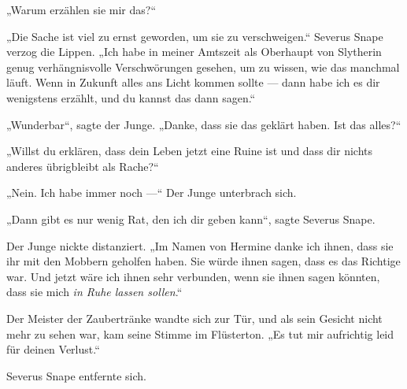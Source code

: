 „Warum erzählen sie mir das?“

„Die Sache ist viel zu ernst geworden, um sie zu verschweigen.“ Severus Snape verzog die Lippen.
„Ich habe in meiner Amtszeit als Oberhaupt von Slytherin genug verhängnisvolle Verschwörungen gesehen, um zu wissen, wie das manchmal läuft. Wenn in Zukunft alles ans Licht kommen sollte — dann habe ich es dir wenigstens erzählt, und du kannst das dann sagen.“

„Wunderbar“, sagte der Junge.
„Danke, dass sie das geklärt haben. Ist das alles?“

„Willst du erklären, dass dein Leben jetzt eine Ruine ist und dass dir nichts anderes übrigbleibt als Rache?“

„Nein. Ich habe immer noch —“ Der Junge unterbrach sich.

„Dann gibt es nur wenig Rat, den ich dir geben kann“, sagte Severus Snape.

Der Junge nickte distanziert.
„Im Namen von Hermine danke ich ihnen, dass sie ihr mit den Mobbern geholfen haben. Sie würde ihnen sagen, dass es das Richtige war. Und jetzt wäre ich ihnen sehr verbunden, wenn sie ihnen sagen könnten, dass sie mich \emph{in Ruhe lassen sollen}.“

Der Meister der Zaubertränke wandte sich zur Tür, und als sein Gesicht nicht mehr zu sehen war, kam seine Stimme im Flüsterton.
„Es tut mir aufrichtig leid für deinen Verlust.“

Severus Snape entfernte sich.

